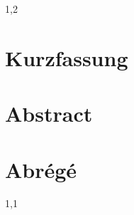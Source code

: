 \documentclass[11pt,a4paper,twoside]{article}
\numberwithin{equation}{section}
\begin{document}
\begin{spacing}{1,2}
\newpage



\thispagestyle{empty}
 \section*{Kurzfassung}

 \section*{Abstract}

 \section*{Abrégé}
 \newpage


\end{spacing}
\begin{spacing}{1,1}
\tableofcontents\newpage

\end{spacing}
\end{document}
